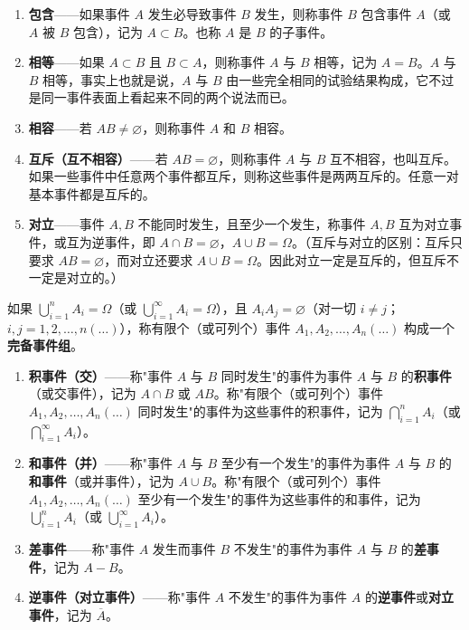 \documentclass[lang=cn,11pt]{elegantbook}
\begin{document}
\begin{enumerate}
    \item \textbf{包含}——如果事件 \(A\) 发生必导致事件 \(B\) 发生，则称事件 \(B\) 包含事件 \(A\)（或 \(A\) 被 \(B\) 包含），记为 \(A \subset B\)。也称 \(A\) 是 \(B\) 的子事件。
    \item \textbf{相等}——如果 \(A \subset B\) 且 \(B \subset A\)，则称事件 \(A\) 与 \(B\) 相等，记为 \(A = B\)。\(A\) 与 \(B\) 相等，事实上也就是说，\(A\) 与 \(B\) 由一些完全相同的试验结果构成，它不过是同一事件表面上看起来不同的两个说法而已。
    \item \textbf{相容}——若 \(AB \neq \varnothing\)，则称事件 \(A\) 和 \(B\) 相容。
    \item \textbf{互斥（互不相容）}——若 \(AB = \varnothing\)，则称事件 \(A\) 与 \(B\) 互不相容，也叫互斥。如果一些事件中任意两个事件都互斥，则称这些事件是两两互斥的。任意一对基本事件都是互斥的。
    \item \textbf{对立}——事件 \(A, B\) 不能同时发生，且至少一个发生，称事件 \(A, B\) 互为对立事件，或互为逆事件，即 \(A \cap B = \varnothing\)，\(A \cup B = \Omega\)。（互斥与对立的区别：互斥只要求 \(AB = \varnothing\)，而对立还要求 \(A \cup B = \Omega\)。因此对立一定是互斥的，但互斥不一定是对立的。）
\end{enumerate}

\begin{definition}[完备事件组] \label{def:complete-event-group}
如果 \(\bigcup_{i=1}^{n} A_i = \Omega\)（或 \(\bigcup_{i=1}^{\infty} A_i = \Omega\)），且 \(A_i A_j = \varnothing\)（对一切 \(i \neq j\)；\(i, j = 1, 2, \dots, n(\dots)\)），称有限个（或可列个）事件 \(A_1, A_2, \dots, A_n(\dots)\) 构成一个\textbf{完备事件组}。
\end{definition}

\begin{enumerate}
    \item \textbf{积事件（交）}——称"事件 \(A\) 与 \(B\) 同时发生"的事件为事件 \(A\) 与 \(B\) 的\textbf{积事件}（或交事件），记为 \(A \cap B\) 或 \(AB\)。称"有限个（或可列个）事件 \(A_1, A_2, \dots, A_n(\dots)\) 同时发生"的事件为这些事件的积事件，记为 \(\bigcap_{i=1}^{n} A_i\)（或 \(\bigcap_{i=1}^{\infty} A_i\)）。
    \item \textbf{和事件（并）}——称"事件 \(A\) 与 \(B\) 至少有一个发生"的事件为事件 \(A\) 与 \(B\) 的\textbf{和事件}（或并事件），记为 \(A \cup B\)。称"有限个（或可列个）事件 \(A_1, A_2, \dots, A_n(\dots)\) 至少有一个发生"的事件为这些事件的和事件，记为 \(\bigcup_{i=1}^{n} A_i\)（或 \(\bigcup_{i=1}^{\infty} A_i\)）。
    \item \textbf{差事件}——称"事件 \(A\) 发生而事件 \(B\) 不发生"的事件为事件 \(A\) 与 \(B\) 的\textbf{差事件}，记为 \(A - B\)。
    \item \textbf{逆事件（对立事件）}——称"事件 \(A\) 不发生"的事件为事件 \(A\) 的\textbf{逆事件}或\textbf{对立事件}，记为 \(\overline{A}\)。
\end{enumerate}
\end{document}
